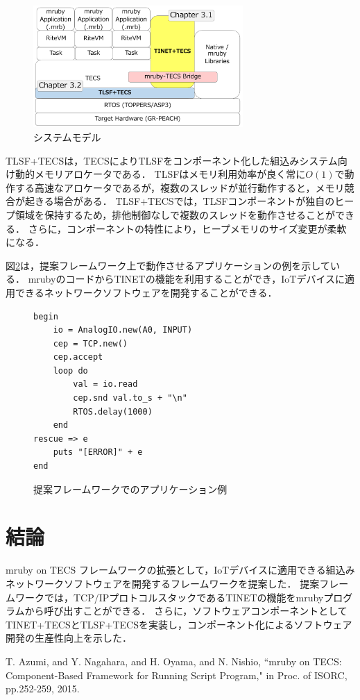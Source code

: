 \documentclass[a4j,10pt,twocolumn]{../styles/utf8/abstract}
\begin{document}
\begin{figure}[h]
    \centering
    \includegraphics[width=8cm,clip]{../figure/SystemModel.pdf}
    \vspace{-0.2cm}
    \caption{システムモデル}
    \vspace{-0.4cm}
    \label{fig:SystemModel}
\end{figure}

TLSF+TECSは，TECSによりTLSFをコンポーネント化した組込みシステム向け動的メモリアロケータである．
TLSFはメモリ利用効率が良く常に$O(1)$で動作する高速なアロケータであるが，複数のスレッドが並行動作すると，メモリ競合が起きる場合がある．
TLSF+TECSでは，TLSFコンポーネントが独自のヒープ領域を保持するため，排他制御なしで複数のスレッドを動作させることができる．
さらに，コンポーネントの特性により，ヒープメモリのサイズ変更が柔軟になる．

図\ref{src:Application}は，提案フレームワーク上で動作させるアプリケーションの例を示している．
mrubyのコードからTINETの機能を利用することができ，IoTデバイスに適用できるネットワークソフトウェアを開発することができる．

\begin{figure}[t]
\centering
\begin{lstlisting}
begin
    io = AnalogIO.new(A0, INPUT)
    cep = TCP.new()
    cep.accept
    loop do
        val = io.read
        cep.snd val.to_s + "\n"
        RTOS.delay(1000)
    end
rescue => e
    puts "[ERROR]" + e
end
\end{lstlisting}
\vspace{-0.2cm}
\caption{提案フレームワークでのアプリケーション例}  
\vspace{-0.4cm}
\label{src:Application}
\end{figure}

\section{結論}

mruby on TECS フレームワークの拡張として，IoTデバイスに適用できる組込みネットワークソフトウェアを開発するフレームワークを提案した．
提案フレームワークでは，TCP/IPプロトコルスタックであるTINETの機能をmrubyプログラムから呼び出すことができる．
さらに，ソフトウェアコンポーネントとしてTINET+TECSとTLSF+TECSを実装し，コンポーネント化によるソフトウェア開発の生産性向上を示した．

%
%
\begin{thebibliography}{1}
    T. Azumi, and Y. Nagahara, and H. Oyama, and N. Nishio, 
    ``mruby on TECS: Component-Based Framework for Running Script Program," 
    in Proc. of ISORC, 
    pp.252-259, 
    2015. 
\end{thebibliography}
\newpage
\pagebreak
\end{document}

